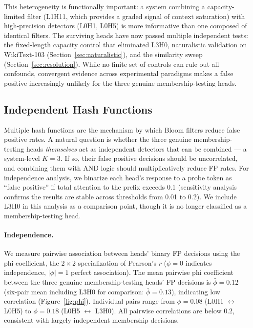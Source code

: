 \documentclass[11pt]{article}
\begin{document}
This heterogeneity is functionally important: a system combining a capacity-limited filter (L1H11, which provides a graded signal of context saturation) with high-precision detectors (L0H1, L0H5) is more informative than one composed of identical filters. The surviving heads have now passed multiple independent tests: the fixed-length capacity control that eliminated L3H0, naturalistic validation on WikiText-103 (Section~\ref{sec:naturalistic}), and the similarity sweep (Section~\ref{sec:resolution}). While no finite set of controls can rule out all confounds, convergent evidence across experimental paradigms makes a false positive increasingly unlikely for the three genuine membership-testing heads.

\subsection{Independent Hash Functions}
\label{sec:hashfunctions}

Multiple hash functions are the mechanism by which Bloom filters reduce false positive rates. A natural question is whether the three genuine membership-testing heads \emph{themselves} act as independent detectors that can be combined --- a system-level $K = 3$. If so, their false positive decisions should be uncorrelated, and combining them with AND logic should multiplicatively reduce FP rates. For independence analysis, we binarize each head's response to a probe token as ``false positive'' if total attention to the prefix exceeds 0.1 (sensitivity analysis confirms the results are stable across thresholds from 0.01 to 0.2). We include L3H0 in this analysis as a comparison point, though it is no longer classified as a membership-testing head.

\paragraph{Independence.} We measure pairwise association between heads' binary FP decisions using the phi coefficient, the $2 \times 2$ specialization of Pearson's $r$ ($\phi = 0$ indicates independence, $|\phi| = 1$ perfect association). The mean pairwise phi coefficient between the three genuine membership-testing heads' FP decisions is $\bar{\phi} = 0.12$ (six-pair mean including L3H0 for comparison: $\bar{\phi} = 0.13$), indicating low correlation (Figure~\ref{fig:phi}). Individual pairs range from $\phi = 0.08$ (L0H1 $\leftrightarrow$ L0H5) to $\phi = 0.18$ (L0H5 $\leftrightarrow$ L3H0). All pairwise correlations are below 0.2, consistent with largely independent membership decisions.
\end{document}
